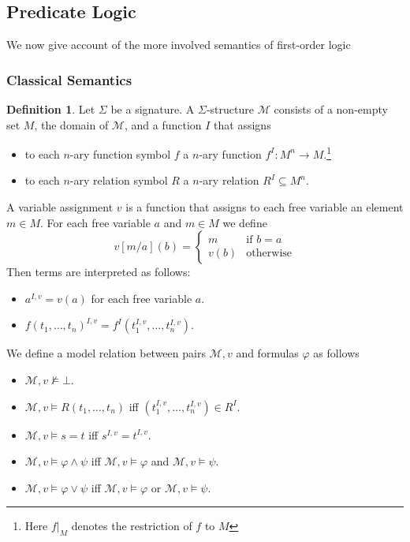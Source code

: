 \documentclass[a4paper,12pt]{report}
\theoremstyle{definition}
\theoremstyle{definition}
\theoremstyle{definition}
\theoremstyle{definition}
\theoremstyle{definition}
\newtheorem{definition}[theorem]{Definition}
\theoremstyle{definition}
\theoremstyle{definition}
\begin{document}
	
	\subsection{Predicate Logic}

	We now give account of the more involved semantics of first-order logic
	
	\subsubsection{Classical Semantics}

	\begin{definition}
		Let $\Sigma$ be a signature. A $\Sigma$-structure $\mathcal{M}$ consists of a non-empty set $M$, the domain of $\mathcal{M}$, and a function $I$ that assigns
		\begin{itemize}
			\item to each $n$-ary function symbol $f$ a $n$-ary function $f^I: M^n\to M$.\footnote{Here $f|_M$ denotes the restriction of $f$ to $M$}
			\item to each $n$-ary relation symbol $R$ a $n$-ary relation $R^I\subseteq M^n$.
		\end{itemize}
		A variable assignment $v$ is a function that assigns to each free variable an element $m\in M$. For each free variable $a$ and $m\in M$ we define $$v[m/a](b) = \begin{cases}
			m&\text{if $b=a$}\\
			v(b)&\text{otherwise}
		\end{cases}$$
		Then terms are interpreted as follows:
		\begin{itemize}
			\item $a^{I, v} = v(a)$ for each free variable $a$.
			\item $f(t_1,\dots,t_n)^{I, v} = f^I(t_1^{I, v},\dots, t_n^{I, v})$.
		\end{itemize}
		We define a model relation between pairs $\mathcal M, v$ and formulas $\varphi$ as follows
		\begin{itemize}
			\item $\mathcal M, v\not\models\bot$.
			\item $\mathcal M, v\models R(t_1,\dots,t_n)$ iff $(t_1^{I, v},\dots,t_n^{I, v})\in R^I$.
			\item $\mathcal M, v\models s = t$ iff $s^{I, v} = t^{I, v}$.
			\item $\mathcal M, v\models \varphi\wedge \psi$ iff $\mathcal M, v\models\varphi$ and $\mathcal M, v\models\psi$.
			\item $\mathcal M, v\models \varphi\vee\psi$ iff $\mathcal M, v\models\varphi$ or $\mathcal M, v\models\psi$.

\end{itemize}
\end{definition}
\end{document}
